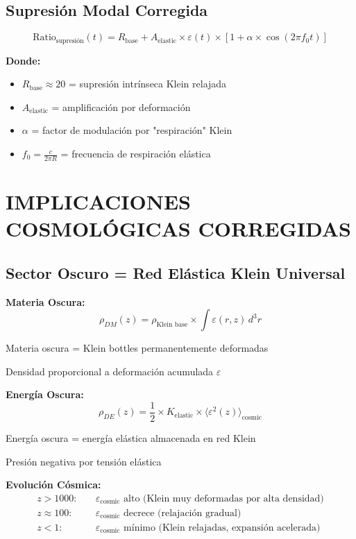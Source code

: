 \documentclass[12pt,a4paper]{article}
\begin{document}
\subsection{Supresión Modal Corregida}

\begin{equation}
\text{Ratio}_{\text{supresión}}(t) = R_{\text{base}} + A_{\text{elastic}} \times \varepsilon(t) \times [1 + \alpha \times \cos(2\pi f_0 t)]
\end{equation}

\textbf{Donde:}
\begin{itemize}
\item $R_{\text{base}} \approx 20$ = supresión intrínseca Klein relajada
\item $A_{\text{elastic}}$ = amplificación por deformación
\item $\alpha$ = factor de modulación por "respiración" Klein
\item $f_0 = \frac{c}{2\pi R}$ = frecuencia de respiración elástica
\end{itemize}

\section{IMPLICACIONES COSMOLÓGICAS CORREGIDAS}

\subsection{Sector Oscuro = Red Elástica Klein Universal}

\textbf{Materia Oscura:}
\begin{equation}
\rho_{DM}(z) = \rho_{\text{Klein base}} \times \int \varepsilon(r,z) \, d^3r
\end{equation}

Materia oscura = Klein bottles permanentemente deformadas

Densidad proporcional a deformación acumulada $\varepsilon$

\textbf{Energía Oscura:}
\begin{equation}
\rho_{DE}(z) = \frac{1}{2} \times K_{\text{elastic}} \times \langle\varepsilon^2(z)\rangle_{\text{cosmic}}
\end{equation}

Energía oscura = energía elástica almacenada en red Klein

Presión negativa por tensión elástica

\textbf{Evolución Cósmica:}
\begin{align}
z > 1000: &\quad \varepsilon_{\text{cosmic}} \text{ alto (Klein muy deformadas por alta densidad)}\\
z \approx 100: &\quad \varepsilon_{\text{cosmic}} \text{ decrece (relajación gradual)}\\
z < 1: &\quad \varepsilon_{\text{cosmic}} \text{ mínimo (Klein relajadas, expansión acelerada)}
\end{align}
\end{document}
